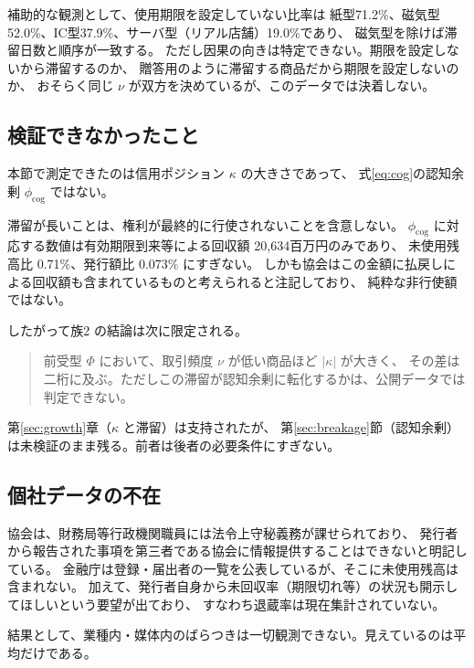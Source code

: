 補助的な観測として、使用期限を設定していない比率は
紙型71.2\%、磁気型52.0\%、IC型37.9\%、サーバ型（リアル店舗）19.0\%であり、
磁気型を除けば滞留日数と順序が一致する。
ただし因果の向きは特定できない。期限を設定しないから滞留するのか、
贈答用のように滞留する商品だから期限を設定しないのか、
おそらく同じ $\nu$ が双方を決めているが、このデータでは決着しない。

\subsection{検証できなかったこと}

\begin{proposition}[測定対象の限定]
本節で測定できたのは信用ポジション $\kappa$ の大きさであって、
式\eqref{eq:cog}の認知余剰 $\phi_{\mathrm{cog}}$ ではない。
\end{proposition}

滞留が長いことは、権利が最終的に行使されないことを含意しない。
$\phi_{\mathrm{cog}}$ に対応する数値は有効期限到来等による回収額 20,634百万円のみであり、
未使用残高比 0.71\%、発行額比 0.073\% にすぎない。
しかも協会はこの金額に払戻しによる回収額も含まれているものと考えられると注記しており、
純粋な非行使額ではない。

したがって族2 の結論は次に限定される。

\begin{quote}
前受型 $\Phi$ において、取引頻度 $\nu$ が低い商品ほど $|\kappa|$ が大きく、
その差は二桁に及ぶ。ただしこの滞留が認知余剰に転化するかは、公開データでは判定できない。
\end{quote}

第\ref{sec:growth}章（$\kappa$ と滞留）は支持されたが、
第\ref{sec:breakage}節（認知余剰）は未検証のまま残る。前者は後者の必要条件にすぎない。

\subsection{個社データの不在}

協会は、財務局等行政機関職員には法令上守秘義務が課せられており、
発行者から報告された事項を第三者である協会に情報提供することはできないと明記している。
金融庁は登録・届出者の一覧を公表しているが、そこに未使用残高は含まれない。
加えて、発行者自身から未回収率（期限切れ等）の状況も開示してほしいという要望が出ており、
すなわち退蔵率は現在集計されていない。

結果として、業種内・媒体内のばらつきは一切観測できない。見えているのは平均だけである。

